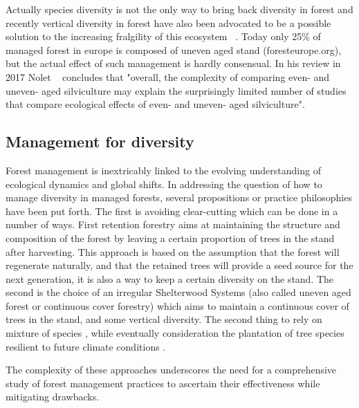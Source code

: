 \documentclass{article}
\begin{document}
Actually species diversity is not the only way to bring back diversity in forest and recently vertical diversity in forest have also been advocated to be a possible solution to the increasing fralgility of this ecosystem ~\autocite{guldinRoleUnevenAgedSilviculture1996}. Today only 25\% of managed forest in europe is composed of uneven aged stand (foresteurope.org), but the actual effect of such management is hardly consensual. In his review in 2017 Nolet ~\autocite{noletComparingEffectsEven2018} concludes that "overall, the complexity	of comparing even- and uneven- aged silviculture may explain the surprisingly limited number of studies that compare ecological effects of even- and uneven- aged silviculture".

\subsection{Management for diversity}

Forest management is inextricably linked to the evolving understanding of ecological dynamics and global shifts. In addressing the question of how to manage diversity in managed forests, several propositions or practice philosophies have been put forth. The first is avoiding clear-cutting which can be done in a number of ways. First retention forestry \autocite{gustafssonRetentionForestryMaintain2012,rosenvaldWhatWhenWhere2008} aims at maintaining the structure and composition of the forest by leaving a certain proportion of trees in the stand after harvesting. This approach is based on the assumption that the forest will regenerate naturally, and that the retained trees will provide a seed source for the next generation, it is also a way to keep a certain diversity on the stand. The second is the choice of an irregular Shelterwood Systems (also called uneven aged forest or continuous cover forestry) \autocite{sinhaOptimalManagementNaturally2017,schallImpactEvenagedUnevenaged2018,nylandEvenUnevenagedChallenges2003,noletComparingEffectsEven2018,dudumanForestManagementPlanning2011} which aims to maintain a continuous cover of trees in the stand, and some vertical diversity. The second thing to rely on mixture of species \autocite{morinTreeSpeciesRichness2011,jourdanManagingMixedStands2021}, while eventually consideration the plantation of tree species resilient to future climate conditions \autocite{websterPromotingMaintainingDiversity2018}.

The complexity of these approaches underscores the need for a comprehensive study of forest management practices to ascertain their effectiveness while mitigating drawbacks.
\end{document}
